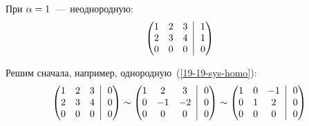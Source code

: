 \documentclass[a4paper,12pt]{article}
\newcommand{\BigMiddleThree}{\;\left|\vphantom{\begin{pmatrix} 0\\0\\0 \end{pmatrix}}\right.\;}
\begin{document}
\begin{solution}
    При $\alpha \hm= 1$~---~неоднородную:
    \begin{equation}\label{19-19-sys-hetero}
      \left(
        \begin{matrix}
          1 & 2 & 3\\
          2 & 3 & 4\\
          0 & 0 & 0
        \end{matrix}
        \BigMiddleThree
        \begin{matrix}
          1\\
          1\\
          0
        \end{matrix}
      \right)
    \end{equation}

    Решим сначала, например, однородную~(\ref{19-19-sys-homo}):
    \[
      \left(
        \begin{matrix}
          1 & 2 & 3\\
          2 & 3 & 4\\
          0 & 0 & 0
        \end{matrix}
        \BigMiddleThree
        \begin{matrix}
          0\\
          0\\
          0
        \end{matrix}
      \right)
      \sim \left(
        \begin{matrix}
          1 & 2 & 3\\
          0 & -1 & -2\\
          0 & 0 & 0
        \end{matrix}
        \BigMiddleThree
        \begin{matrix}
          0\\
          0\\
          0
        \end{matrix}
      \right)
      \sim \left(
        \begin{matrix}
          1 & 0 & -1\\
          0 & 1 & 2\\
          0 & 0 & 0
        \end{matrix}
        \BigMiddleThree
        \begin{matrix}
          0\\
          0\\
          0
        \end{matrix}
      \right)
    \]


\end{solution}
\end{document}
